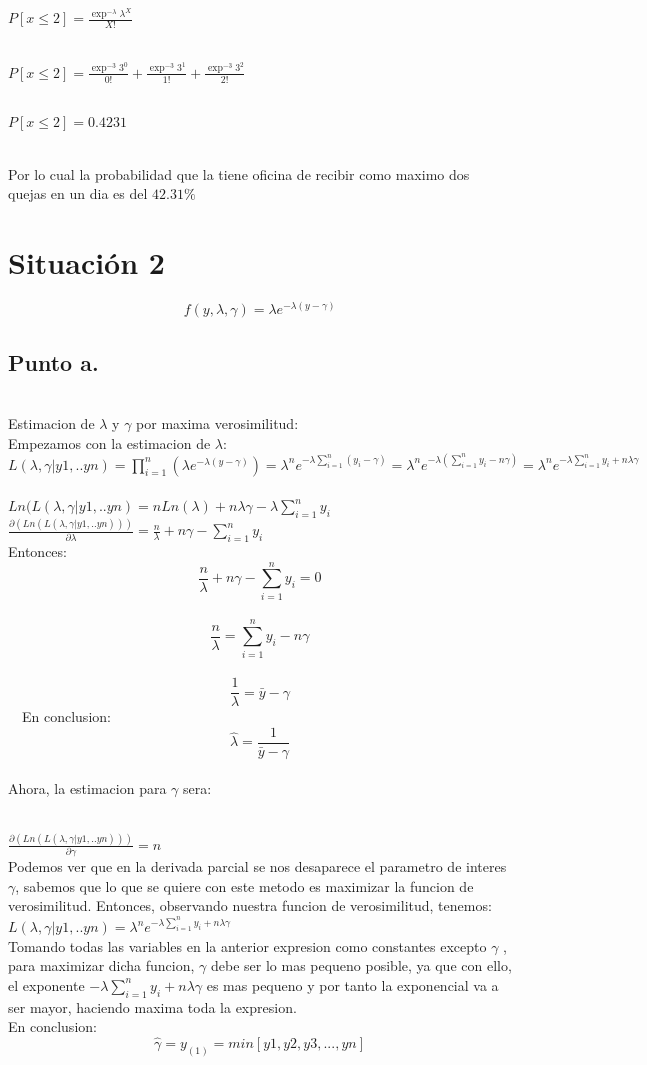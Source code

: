 \documentclass[letterpaper,12pt,onecolumn,titlepage]{article}
\begin{document}
~\\ $P[x\le2]= \frac{\exp^{-\lambda}\lambda^{X}}{X!}$

~\\ $P[x\le2]= \frac{\exp^{-3}3^{0}}{0!} + 
			 \frac{\exp^{-3}3^{1}}{1!} + 
			 \frac{\exp^{-3}3^{2}}{2!}$
			 
~\\ $P[x\le2]= 0.4231 $

~\\ Por lo cual la probabilidad que la tiene oficina de recibir como maximo dos quejas en un dia es del {$42.31\%$}

\pagebreak\section{Situaci\'{o}n 2}
$$f(y,\lambda,\gamma)=\lambda e^{-\lambda(y-\gamma)}$$
\subsection{Punto a.}
~\\Estimacion de $\lambda$ y $\gamma$ por maxima verosimilitud:
~\\ Empezamos con la estimacion de $\lambda$:
~\\ $L(\lambda,\gamma |y1,..yn)=\prod \limits_{i=1}^{n}(\lambda e^{-\lambda (y-\gamma)})=\lambda^n e^{-\lambda \sum \limits_{i=1}^{n}({y_{i}-\gamma})}=\lambda^n e^{-\lambda (\sum \limits_{i=1}^{n}{y_{i}}-n\gamma)}=\lambda^n e^{-\lambda\sum\limits_{i=1}^{n}{y_{i}}+n\lambda\gamma}$
~\\ $Ln(L(\lambda,\gamma |y1,..yn)=nLn(\lambda)+n\lambda\gamma-\lambda\sum\limits_{i=1}^{n}{y_{i}}$
~\\ $\frac{\partial(Ln(L(\lambda,\gamma |y1,..yn)))}{\partial\lambda}=\frac{n}{\lambda}+n\gamma-\sum\limits_{i=1}^{n}{y_{i}}$
~\\Entonces:
$$\frac{n}{\lambda}+n\gamma-\sum\limits_{i=1}^{n}{y_{i}}=0$$
~\ $$\frac{n}{\lambda}=\sum\limits_{i=1}^{n}{y_{i}}-n\gamma$$
~\ $$\frac{1}{\lambda}=\bar{y}-\gamma$$
~\ En conclusion:
$$\hat{\lambda}=\frac{1}{\bar{y}-\gamma}$$
~\\ Ahora, la estimacion para $\gamma$ sera:

~\\ $\frac{\partial(Ln(L(\lambda,\gamma |y1,..yn)))}{\partial\gamma}= n$
~\\ Podemos ver que en la derivada parcial se nos desaparece el parametro de interes $\gamma$, sabemos que lo que se quiere con este metodo es maximizar la funcion de verosimilitud. Entonces, observando nuestra funcion de verosimilitud, tenemos:
~\\ $L(\lambda,\gamma |y1,..yn)=\lambda^n e^{-\lambda\sum\limits_{i=1}^{n}{y_{i}}+n\lambda\gamma}$
~\\ Tomando todas las variables en la anterior expresion como constantes excepto $\gamma$ , para maximizar dicha funcion, $\gamma$  debe ser lo mas pequeno posible, ya que con ello, el exponente $-\lambda\sum\limits_{i=1}^{n}{y_{i}}+n\lambda\gamma$ es mas pequeno y por tanto la exponencial va a ser mayor, haciendo maxima toda la expresion.
~\\ En conclusion:
$$\hat{\gamma}=y_(1)= min[y1,y2,y3,...,yn]$$
 
\end{document}
